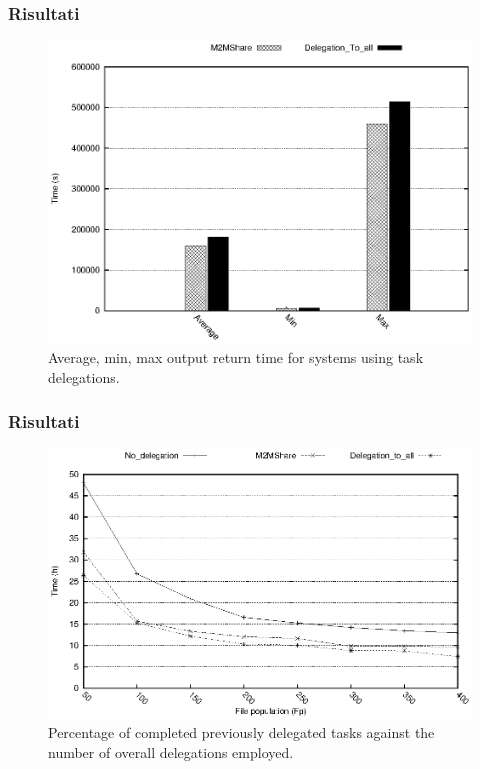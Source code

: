 \documentclass{beamer}
\begin{document}
\begin{frame}
\frametitle{Risultati}
\begin{center}
\begin{figure}[ht]
\includegraphics[scale=0.7]{../grafici/tempiRitornoDeleghe.eps}
\caption{Average, min, max output return time for systems using task delegations.}
\end{figure}
\end{center}
\end{frame}

\begin{frame}
\frametitle{Risultati}
\begin{center}
\begin{figure}[ht]
\includegraphics[scale=0.7]{../grafici/tempiVFDiversaPop.eps}
    \caption{Percentage of completed previously delegated tasks against the number of overall delegations employed.}
\end{figure}
\end{center}
\end{frame}
\end{document}
